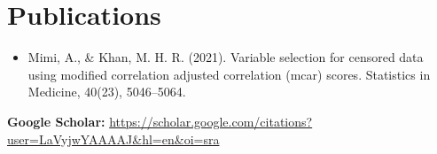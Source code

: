 \documentclass[10pt, letterpaper]{article}
\begin{document}
    \section{Publications}
        
        \begin{samepage}
        \begin{itemize}
            \item Mimi, A., \& Khan, M. H. R. (2021). Variable selection for censored data using modified correlation adjusted correlation (mcar) scores. Statistics in Medicine, 40(23), 5046–5064.     
           

        \end{itemize}
        \textbf{Google Scholar:} \href{https://scholar.google.com/citations?user=LaVyjwYAAAAJ&hl=en&oi=sra}{https://scholar.google.com/citations?user=LaVyjwYAAAAJ\&hl=en\&oi=sra}
         \end{samepage}
\end{document}
